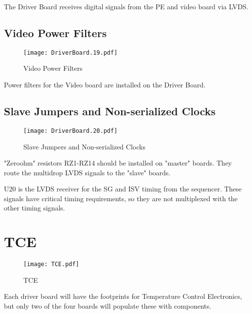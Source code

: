 The Driver Board receives digital signals from the PE and video board via LVDS.



\subsection{Video Power Filters}
   \begin{figure}
   \begin{center}
   \texttt{[image: DriverBoard.19.pdf]}
   \end{center}
   \caption{Video Power Filters}
   \end{figure}

Power filters for the Video board are installed on the Driver Board.

\subsection{Slave Jumpers and Non-serialized Clocks}
   \begin{figure}
   \begin{center}
   \texttt{[image: DriverBoard.20.pdf]}
   \end{center}
   \caption{Slave Jumpers and Non-serialized Clocks}
   \end{figure}

"Zeroohm" resistors RZ1-RZ14 should be installed on "master" boards. They route the multidrop LVDS signals to the "slave" boards.

U20 is the LVDS receiver for the SG and ISV timing from the sequencer. These signals have critical timing requirements, so they are not multiplexed with the other timing signals.


\section{TCE}

   \begin{figure}
   \begin{center}
   \texttt{[image: TCE.pdf]}
   \end{center}
   \caption{TCE}
   \end{figure}


Each driver board will have the footprints for Temperature Control Electronics, but only two of the four boards will populate these with components.



